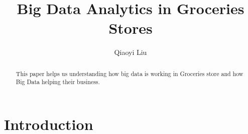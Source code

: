 \documentclass[sigconf]{acmart}
\begin{document}
\author{Qiaoyi Liu}


\title{Big Data Analytics in Groceries Stores}

\renewcommand{\shortauthors}{Q. Liu}

\begin{abstract}
This paper helps us understanding how big data is working 
       in Groceries store and how Big Data helping their business.
\end{abstract}


\maketitle

\section{Introduction}
\end{document}
